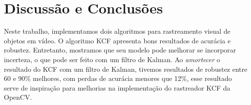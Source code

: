 \documentclass[conference]{IEEEtran}
\begin{document}
\section{Discussão e Conclusões}
Neste trabalho, implementamos dois algoritmos para rastreamento visual de objetos em vídeo. O algoritmo KCF apresenta bons resultados de acurácia e robustez.  Entretanto, mostramos que seu modelo pode melhorar se incorporar incerteza, o que pode ser feito com um filtro de Kalman. Ao \textit{amortecer}  o resultado do KCF com um filtro de Kalman, tivemos resultados de robustez entre 60 e 90\% melhores, com perdas de acurácia menores que 12\%, esse resultado serve de inspiração para melhorias na implementação do rastreador KCF da OpenCV. 




\end{document}

